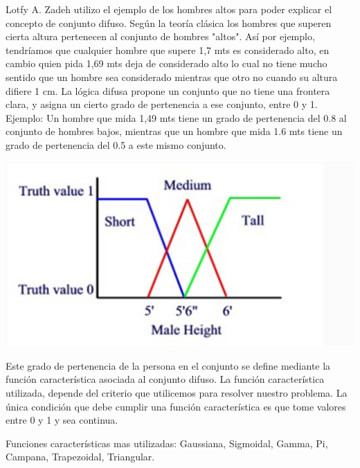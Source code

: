 Lotfy A. Zadeh utilizo el ejemplo de los hombres altos para poder explicar el concepto de conjunto difuso. Según la teoría clásica los hombres que superen cierta altura pertenecen al conjunto de hombres "altos". Así por ejemplo, tendríamos que cualquier hombre que supere 1,7 mts es considerado alto, en cambio quien pida 1,69 mts deja de considerado alto lo cual no tiene mucho sentido que un hombre sea considerado mientras que otro no cuando su altura difiere 1 cm. La lógica difusa propone un conjunto que no tiene una frontera clara, y asigna un cierto grado de pertenencia a ese conjunto, entre 0 y 1. Ejemplo: Un hombre que mida 1,49 mts tiene un grado de pertenencia del 0.8 al conjunto de hombres bajos, mientras que un hombre que mida 1.6 mts tiene un grado de pertenencia del 0.5 a este mismo conjunto.\par

\begin{center}
\includegraphics[scale=0.2]{Tesis/Capitulos/02_MARCO_TEORICO/img/ConjDifuso.png}
\end{center}

Este grado de pertenencia de la persona en el conjunto se define mediante la función característica asociada al conjunto difuso. La función característica utilizada, depende del criterio que utilicemos para resolver nuestro problema. La única condición que debe cumplir una función característica es que tome valores entre 0 y 1 y sea continua.\par

Funciones características mas utilizadas: Gaussiana, Sigmoidal, Gamma, Pi, Campana, Trapezoidal, Triangular.\par

